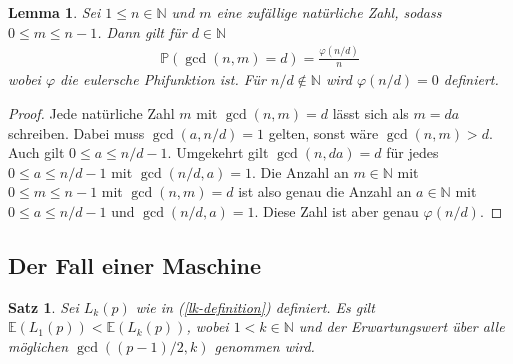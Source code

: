 \documentclass[a4paper, 10pt, ngerman]{article}
\newcommand{\E}{\mathbb{E}}
\newcommand{\N}{\mathbb{N}}
\newtheorem{theorem}{Satz}
\newtheorem{lemma}{Lemma}
\begin{document}
\begin{lemma}\label{lemma:gcd-probability}
    Sei $1 \le n \in \N$ und $m$ eine zufällige natürliche Zahl, sodass $0 \le m \le n - 1$. Dann gilt für $d \in \N$
    \begin{align*}
        \mathbb{P}(\gcd(n, m) = d) = \frac {\varphi(n / d)} n
    \end{align*}
    wobei $\varphi$ die eulersche Phifunktion ist. Für $n/d \notin \N$ wird $\varphi(n/d) = 0$ definiert.
\end{lemma}

\begin{proof}
    Jede natürliche Zahl $m$ mit $\gcd(n, m) = d$ lässt sich als $m = da$ schreiben. Dabei muss $\gcd(a, n / d) = 1$ gelten, sonst wäre $\gcd(n, m) > d$. Auch gilt $0 \le a \le n/d - 1$. Umgekehrt gilt $\gcd(n, da) = d$ für jedes $0 \le a \le n/d - 1$ mit $\gcd(n/d, a) = 1$. Die Anzahl an $m \in \N$ mit $0 \le m \le n - 1$ mit $\gcd(n, m) = d$ ist also genau die Anzahl an $a \in \N$ mit $0 \le a \le  n / d - 1$ und $\gcd(n / d, a) = 1$. Diese Zahl ist aber genau $\varphi(n/d)$.
\end{proof}

\subsection{Der Fall einer Maschine}

\begin{theorem}
    \label{theorem:optimal-k-m1}
    Sei $L_k(p)$ wie in (\ref{lk-definition}) definiert. Es gilt $\E(L_1(p)) < \E(L_k(p))$, wobei $1 < k \in \N$ und der Erwartungswert über alle möglichen $\gcd((p - 1)/2, k)$ genommen wird.
\end{theorem}
\end{document}
